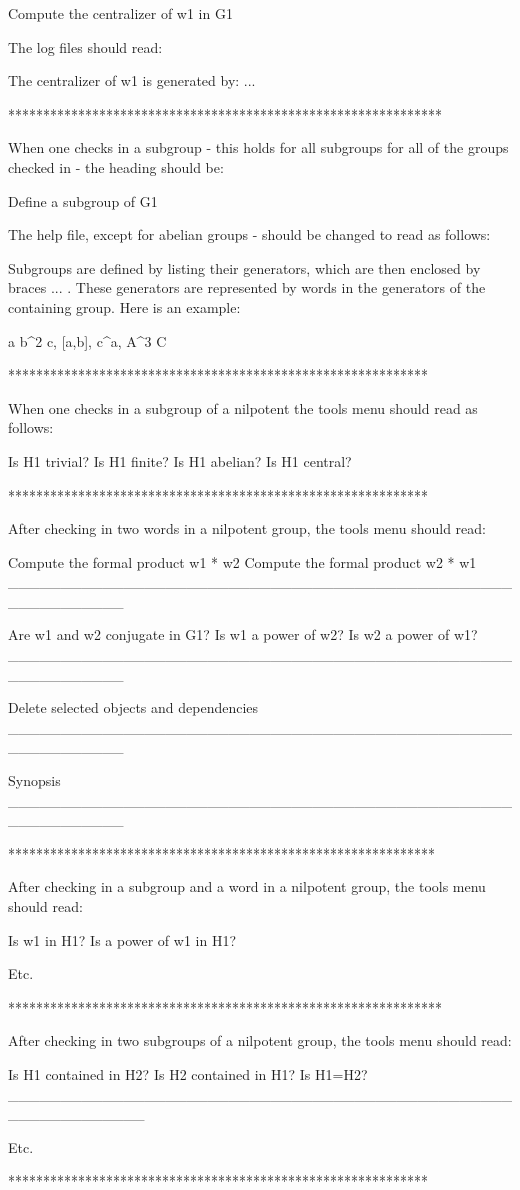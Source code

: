 Compute the centralizer of w1 in G1

The log files should read:

The centralizer of w1 is generated by: ...    

**************************************************************

When one checks in a subgroup - this holds for all subgroups 
for all of the groups checked in - the 
heading should be:

Define a subgroup of G1

The help file, except for abelian groups - should be changed 
to read as follows:

Subgroups are defined by listing their generators, which are
then enclosed by braces { ... }. These generators are represented 
by words in the generators of the containing group. Here is an
example:

{ a b^2 c, [a,b], c^a, A^3 C }

************************************************************

When one checks in a subgroup of a nilpotent the tools menu
should read as follows:

Is H1 trivial?
Is H1 finite?
Is H1 abelian?
Is H1 central?

************************************************************

After checking in two words in a nilpotent group, the tools
menu should read:

Compute the formal product w1 * w2
Compute the formal product w2 * w1
___________________________________________________________

Are w1 and w2 conjugate in G1?
Is w1 a power of w2?
Is w2 a power of w1?
___________________________________________________________

Delete selected objects and dependencies
___________________________________________________________

Synopsis
___________________________________________________________

*************************************************************

After checking in a subgroup and a word in a nilpotent group,
the tools menu should read:

Is w1 in H1?
Is a power of w1 in H1?

Etc.

**************************************************************

After checking in two subgroups of a nilpotent group, the
tools menu should read:

Is H1 contained in H2?
Is H2 contained in H1?
Is H1=H2?
_____________________________________________________________

Etc.

************************************************************


